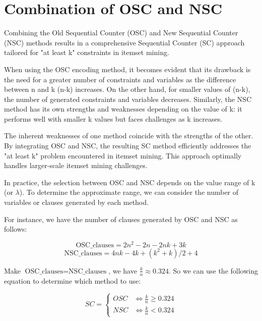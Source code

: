 \section{Combination of OSC and NSC}

Combining the Old Sequential Counter (OSC) and New Sequential Counter (NSC) methods results in a comprehensive Sequential Counter (SC) approach tailored for "at least k" constraints in itemset mining.

When using the OSC encoding method, it becomes evident that its drawback is the need for a greater number of constraints and variables as the difference between n and k (n-k) increases.
On the other hand, for smaller values of (n-k), the number of generated constraints and variables decreases.
Similarly, the NSC method has its own strengths and weaknesses depending on the value of k: it performs well with smaller k values but faces challenges as k increases.

The inherent weaknesses of one method coincide with the strengths of the other. By integrating OSC and NSC, the resulting SC method efficiently addresses the "at least k" problem encountered in itemset mining. This approach optimally handles larger-scale itemset mining challenges.

In practice, the selection between OSC and NSC depends on the value range of k (or $\lambda$).
To determine the approximate range, we can consider the number of variables or clauses generated by each method.

For instance, we have the number of clauses generated by OSC and NSC as follows:

\begin{equation*}
    \text{OSC\_clauses} = 2n^2 - 2n - 2nk + 3k
\end{equation*}
\begin{equation*}
    \text{NSC\_clauses} = 4nk - 4k + (k^2+k)/2 + 4
\end{equation*}

Make $\text{OSC\_clauses} = \text{NSC\_clauses}$, we have $\frac{k}{n} \approx 0.324$.
So we can use the following equation to determine which method to use:

\begin{equation}
    \label{eq:sc_osc_nsc}
    SC =
    \begin{cases}
        OSC & \iff \frac{k}{n} \geq 0.324 \\
        NSC & \iff \frac{k}{n} < 0.324
    \end{cases}
\end{equation}

